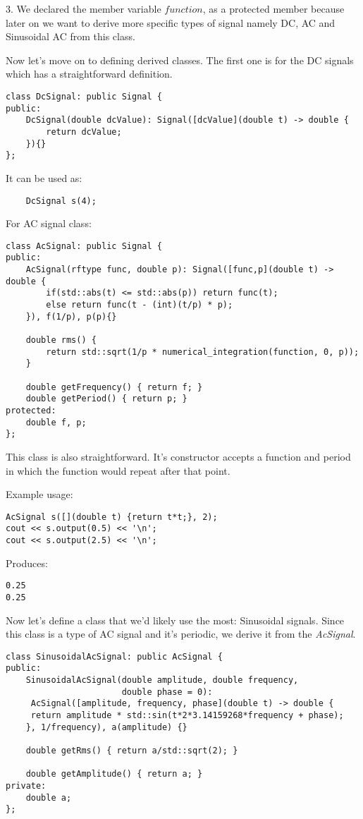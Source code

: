 \documentclass{article}
\begin{document}
	3. We declared the member variable $function$, as a protected member because later on we want to derive more specific types of signal namely DC, AC and Sinusoidal AC from this class.
	 
	Now let's move on to defining derived classes. The first one is for the DC signals which has a straightforward definition.
	
	\begin{verbatim}
class DcSignal: public Signal {
public:
    DcSignal(double dcValue): Signal([dcValue](double t) -> double {
        return dcValue;
    }){}
};
	\end{verbatim}
	
	It can be used as:
	
	\begin{verbatim}
	DcSignal s(4);
	\end{verbatim}
	
	For AC signal class:
	\begin{verbatim}
class AcSignal: public Signal {
public:
    AcSignal(rftype func, double p): Signal([func,p](double t) -> double {
        if(std::abs(t) <= std::abs(p)) return func(t);
        else return func(t - (int)(t/p) * p);
    }), f(1/p), p(p){}
		
    double rms() {
        return std::sqrt(1/p * numerical_integration(function, 0, p));
    }
		
    double getFrequency() { return f; }
    double getPeriod() { return p; }
protected:
    double f, p;
};
	\end{verbatim}

	This class is also straightforward. It's constructor accepts a function and period in which the function would repeat after that point.
	
	Example usage:
	
	\begin{verbatim}
AcSignal s([](double t) {return t*t;}, 2);
cout << s.output(0.5) << '\n';
cout << s.output(2.5) << '\n';
	\end{verbatim}
	
	Produces:
	
	\begin{verbatim}
0.25
0.25
	\end{verbatim}

	Now let's define a class that we'd likely use the most: Sinusoidal signals. Since this class is a type of AC signal and it's periodic, we derive it from the \textit{AcSignal}.
	
	\begin{verbatim}
class SinusoidalAcSignal: public AcSignal {
public:
    SinusoidalAcSignal(double amplitude, double frequency,
                       double phase = 0):
     AcSignal([amplitude, frequency, phase](double t) -> double {
     return amplitude * std::sin(t*2*3.14159268*frequency + phase);
    }, 1/frequency), a(amplitude) {}

    double getRms() { return a/std::sqrt(2); }

    double getAmplitude() { return a; }
private:
    double a;
};
	\end{verbatim}
\end{document}
